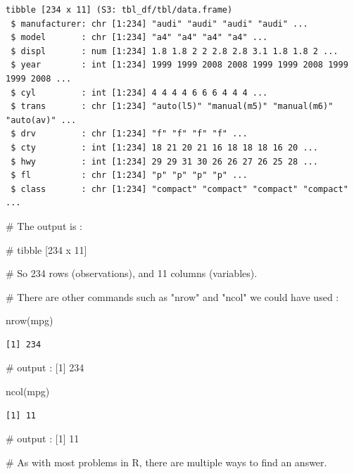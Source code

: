 \documentclass[
  letterpaper,
  DIV=11,
  numbers=noendperiod]{scrreprt}
\newenvironment{Shaded}{\begin{snugshade}}{\end{snugshade}}
\newcommand{\CommentTok}[1]{\textcolor[rgb]{0.37,0.37,0.37}{#1}}
\newcommand{\FunctionTok}[1]{\textcolor[rgb]{0.28,0.35,0.67}{#1}}
\newcommand{\NormalTok}[1]{\textcolor[rgb]{0.00,0.23,0.31}{#1}}
\begin{document}
\begin{verbatim}
tibble [234 x 11] (S3: tbl_df/tbl/data.frame)
 $ manufacturer: chr [1:234] "audi" "audi" "audi" "audi" ...
 $ model       : chr [1:234] "a4" "a4" "a4" "a4" ...
 $ displ       : num [1:234] 1.8 1.8 2 2 2.8 2.8 3.1 1.8 1.8 2 ...
 $ year        : int [1:234] 1999 1999 2008 2008 1999 1999 2008 1999 1999 2008 ...
 $ cyl         : int [1:234] 4 4 4 4 6 6 6 4 4 4 ...
 $ trans       : chr [1:234] "auto(l5)" "manual(m5)" "manual(m6)" "auto(av)" ...
 $ drv         : chr [1:234] "f" "f" "f" "f" ...
 $ cty         : int [1:234] 18 21 20 21 16 18 18 18 16 20 ...
 $ hwy         : int [1:234] 29 29 31 30 26 26 27 26 25 28 ...
 $ fl          : chr [1:234] "p" "p" "p" "p" ...
 $ class       : chr [1:234] "compact" "compact" "compact" "compact" ...
\end{verbatim}

\begin{Shaded}
\begin{Highlighting}[]
\CommentTok{\# The output is : }

\CommentTok{\# tibble [234 x 11] }

\CommentTok{\# So 234 rows (observations), and 11 columns (variables).}

\CommentTok{\# There are other commands such as "nrow" and "ncol" we could have used :}

\FunctionTok{nrow}\NormalTok{(mpg)}
\end{Highlighting}
\end{Shaded}

\begin{verbatim}
[1] 234
\end{verbatim}

\begin{Shaded}
\begin{Highlighting}[]
\CommentTok{\# output : [1] 234}

\FunctionTok{ncol}\NormalTok{(mpg)}
\end{Highlighting}
\end{Shaded}

\begin{verbatim}
[1] 11
\end{verbatim}

\begin{Shaded}
\begin{Highlighting}[]
\CommentTok{\# output : [1] 11}

\CommentTok{\# As with most problems in R, there are multiple ways to find an answer.}
\end{Highlighting}
\end{Shaded}
\end{document}
